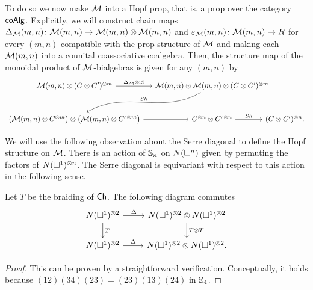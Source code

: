 To do so we now make $\M$ into a Hopf prop, that is, a prop over the category $\coAlg$.
Explicitly, we will construct chain maps $\Delta_\M(m,n) \colon \M(m,n) \to \M(m,n) \otimes \M(m,n)$ and $\varepsilon_\M(m,n) \colon \M(m,n) \to R$ for every $(m,n)$ compatible with the prop structure of $\M$ and making each $\M(m,n)$ into a counital coassociative coalgebra.
Then, the structure map of the monoidal product of $\M$-bialgebras is given for any $(m,n)$ by 
\begin{equation*}
\begin{tikzcd} [column sep = small, row sep=large]
\M(m,n) \otimes (C \otimes C^\prime)^{\otimes m} \arrow[r, "\Delta_\M \otimes \id"] & \M(m,n) \otimes \M(m,n) \otimes (C \otimes C^\prime)^{\otimes m} \arrow[dl, out=-150, in=30, "Sh"'] &[-25pt] \\
\big(\M(m,n) \otimes C^{\otimes m}\big) \otimes \big(\M(m,n) \otimes C^{\prime\, \otimes m}\big) \arrow[r] & 
C^{\otimes n} \otimes C^{\prime\, \otimes n} \arrow[r, "Sh"] &[-25pt]
(C \otimes C^\prime)^{\otimes n}.
\end{tikzcd}
\end{equation*}

We will use the following observation about the Serre diagonal to define the Hopf structure on $\M$.
There is an action of $\S_n$ on $\cchains(\square^n)$ given by permuting the factors of $\cchains(\square^1)^{\otimes n}$.
The Serre diagonal is equivariant with respect to this action in the following sense.

\begin{lemma} \label{l:serre diagonal invariant}
	Let $T$ be the braiding of $\Ch$.
	The following diagram commutes
	\begin{equation*}
	\begin{tikzcd}
	\cchains(\square^1)^{\otimes 2} \arrow[r, "\Delta"] \arrow[d, "T"] &
	\cchains(\square^1)^{\otimes 2} \otimes \cchains(\square^1)^{\otimes 2} \arrow[d, "T \otimes T"] \\
	\cchains(\square^1)^{\otimes 2} \arrow[r, "\Delta"] &
	\cchains(\square^1)^{\otimes 2} \otimes \cchains(\square^1)^{\otimes 2}.
	\end{tikzcd}
	\end{equation*}
\end{lemma}

\begin{proof}
	This can be proven by a straightforward verification. Conceptually, it holds because $(12)(34)(23) = (23)(13)(24)$ in $\S_4$.
\end{proof}

